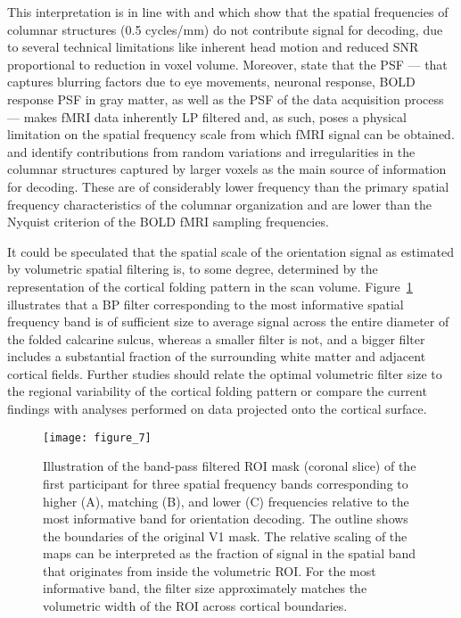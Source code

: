 This interpretation is in line with \citet{kamitani_2005} and
\citet{chaimow_2011} which show that the spatial frequencies of columnar structures (0.5
cycles/mm) do not contribute signal for decoding, due to several technical
limitations like inherent head motion and reduced SNR proportional to reduction
in voxel volume.  Moreover, \citet{shmuel_2007} state that the PSF --- that
captures blurring factors due to eye movements, neuronal response, BOLD
response PSF in gray matter, as well as the PSF of the data acquisition process
--- makes fMRI data inherently LP filtered and, as such, poses a physical
limitation on the spatial frequency scale from which fMRI signal can be
obtained. \citet{kamitani_2005} and \citet{chaimow_2011} identify contributions
from random variations and irregularities in the columnar structures captured
by larger voxels as the main source of information for decoding.  These are of
considerably lower frequency than the primary spatial frequency
characteristics of the columnar organization and are lower than the Nyquist
criterion of the BOLD fMRI sampling frequencies.

It could be speculated that the spatial scale of the orientation signal as
estimated by volumetric spatial filtering is, to some degree, determined by the
representation of the cortical folding pattern in the scan volume.
Figure~\ref{fig:distance_plot} illustrates that a BP filter corresponding to
the most informative spatial frequency band is of sufficient size to average
signal across the entire diameter of the folded calcarine sulcus, whereas a
smaller filter is not, and a bigger filter includes a substantial fraction of
the surrounding white matter and adjacent cortical fields. Further
studies should relate the optimal volumetric filter size to the regional
variability of the cortical folding pattern \cite[see, for
example,][]{germanaud_2012} or compare the current findings with analyses
performed on data projected onto the cortical surface.

\begin{figure} \centering
  \texttt{[image: figure\_7]}
  \caption{
    Illustration of the band-pass filtered ROI mask (coronal slice) of the
    first participant for three spatial frequency bands corresponding to higher
    (A), matching (B), and lower (C) frequencies relative to the most
    informative band for orientation decoding. The outline shows the boundaries
    of the original V1 mask. The relative scaling of the maps can be
    interpreted as the fraction of signal in the spatial band that originates
    from inside the volumetric ROI. For the most informative band, the filter
    size approximately matches the volumetric width of the ROI across cortical
    boundaries.
  }

    \label{fig:distance_plot}
\end{figure}


